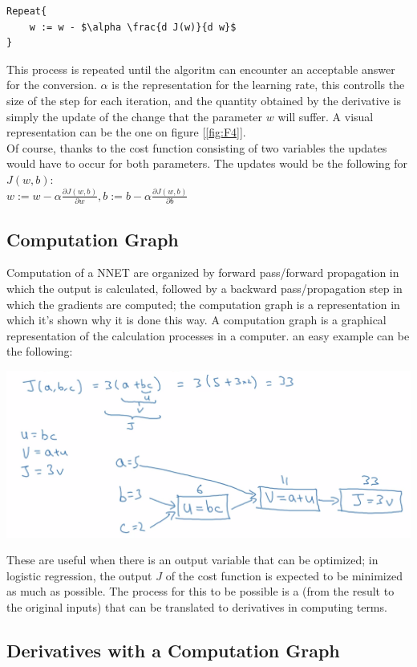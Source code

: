 \documentclass[11pt]{report}
\begin{document}
\begin{lstlisting}[mathescape=true]
Repeat{
    w := w - $\alpha \frac{d J(w)}{d w}$
}
\end{lstlisting}
This process is repeated until the algoritm can encounter an acceptable answer for the conversion. $\alpha$ is the representation for the learning rate, this controlls the size of the step for each iteration, and the quantity obtained by the derivative is simply the update of the change that the parameter $w$ will suffer. A visual representation can be the one on figure [\ref{fig:F4}].\\
Of course, thanks to the cost function consisting of two variables the updates would have to occur for both parameters. The updates would be the following for $J(w,b)$:\\
$w := w - \alpha \frac{\partial J(w,b)}{\partial w}, b := b - \alpha \frac{\partial J(w,b)}{\partial b}$\\

\subsection{Computation Graph}
Computation of a NNET are organized by forward pass/forward propagation in which the output is calculated, followed by a backward pass/propagation step in which the gradients are computed; the computation graph is a representation in which it's shown why it is done this way. A computation graph is a graphical representation of the calculation processes in a computer. an easy example can be the following:
\begin{center}
    \includegraphics[width = .75\textwidth]{CG.png}
\end{center}
These are useful when there is an output variable that can be optimized; in logistic regression, the output $J$ of the cost function is expected to be minimized as much as possible. The process for this to be possible is a  (from the result to the original inputs) that can be translated to derivatives in computing terms.

\subsection{Derivatives with a Computation Graph}
\end{document}
